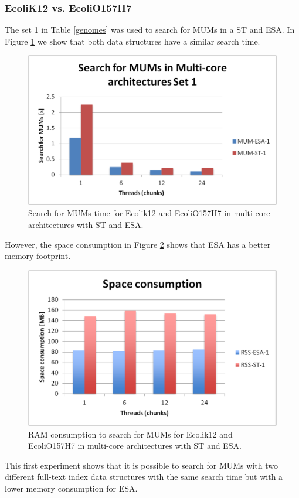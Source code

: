 \documentclass[runningheads,a4paper]{llncs}
\begin{document}
\subsubsection{EcoliK12 vs. EcoliO157H7}
The set 1 in Table \ref{genomes} was used to search for MUMs in a ST and ESA. In Figure \ref{fig:ecoli-mum} we show that both data structures have a similar search time.
\begin{figure}[h]
  \centering
  \includegraphics[scale=0.3]{ecoli-MUM.eps}
  \caption{Search for MUMs time for Ecolik12 and EcoliO157H7 in multi-core architectures with ST and ESA.}
  \label{fig:ecoli-mum}
\end{figure}  
However, the space consumption in Figure \ref{fig:ecoli-ram} shows that ESA has a better memory footprint.
\begin{figure}[h]
  \centering
  \includegraphics[scale=0.3]{ecoli-RAM.eps}
  \caption{RAM consumption to search for MUMs for Ecolik12 and EcoliO157H7 in multi-core architectures with ST and ESA.}
  \label{fig:ecoli-ram}
\end{figure}  
This first experiment shows that it is possible to search for MUMs with two different full-text index data structures with the same search time but with a lower memory consumption for ESA.
\end{document}
